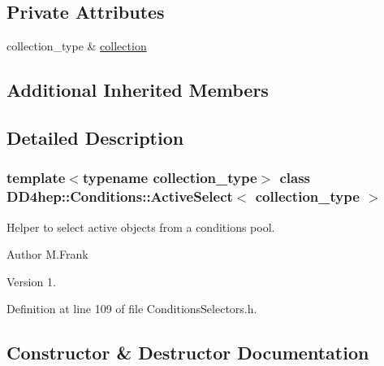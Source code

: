 \subsection*{Private Attributes}
\begin{DoxyCompactItemize}
\item 
collection\+\_\+type \& \hyperlink{class_d_d4hep_1_1_conditions_1_1_active_select_a413343e5a2aaf171132771e5ad3e0f5d}{collection}
\end{DoxyCompactItemize}
\subsection*{Additional Inherited Members}


\subsection{Detailed Description}
\subsubsection*{template$<$typename collection\+\_\+type$>$\newline
class D\+D4hep\+::\+Conditions\+::\+Active\+Select$<$ collection\+\_\+type $>$}

Helper to select active objects from a conditions pool. 

\begin{DoxyAuthor}{Author}
M.\+Frank 
\end{DoxyAuthor}
\begin{DoxyVersion}{Version}
1. 
\end{DoxyVersion}


Definition at line 109 of file Conditions\+Selectors.\+h.



\subsection{Constructor \& Destructor Documentation}
\hypertarget{class_d_d4hep_1_1_conditions_1_1_active_select_a2d9d54374f340a323ce197c662669427}{}\label{class_d_d4hep_1_1_conditions_1_1_active_select_a2d9d54374f340a323ce197c662669427} 

